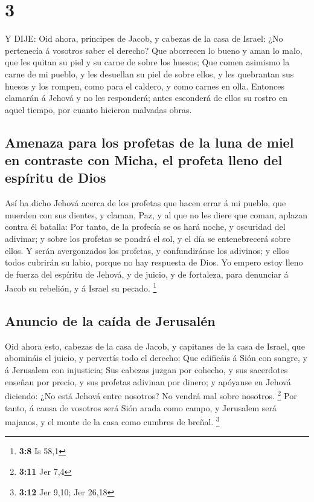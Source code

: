 \hypertarget{section-2}{%
\section{3}\label{section-2}}

 Y DIJE: Oid ahora, príncipes de Jacob, y cabezas de la casa
de Israel: ¿No pertenecía á vosotros saber el derecho?  Que
aborrecen lo bueno y aman lo malo, que les quitan su piel y su carne de
sobre los huesos;  Que comen asimismo la carne de mi pueblo,
y les desuellan su piel de sobre ellos, y les quebrantan sus huesos y
los rompen, como para el caldero, y como carnes en olla. 
Entonces clamarán á Jehová y no les responderá; antes esconderá de ellos
su rostro en aquel tiempo, por cuanto hicieron malvadas obras.

\hypertarget{amenaza-para-los-profetas-de-la-luna-de-miel-en-contraste-con-micha-el-profeta-lleno-del-espuxedritu-de-dios}{%
\subsection{Amenaza para los profetas de la luna de miel en contraste
con Micha, el profeta lleno del espíritu de
Dios}\label{amenaza-para-los-profetas-de-la-luna-de-miel-en-contraste-con-micha-el-profeta-lleno-del-espuxedritu-de-dios}}

 Así ha dicho Jehová acerca de los profetas que hacen errar
á mi pueblo, que muerden con sus dientes, y claman, Paz, y al que no les
diere que coman, aplazan contra él batalla:  Por tanto, de
la profecía se os hará noche, y oscuridad del adivinar; y sobre los
profetas se pondrá el sol, y el día se entenebrecerá sobre ellos.
 Y serán avergonzados los profetas, y confundiránse los
adivinos; y ellos todos cubrirán su labio, porque no hay respuesta de
Dios.  Yo empero estoy lleno de fuerza del espíritu de
Jehová, y de juicio, y de fortaleza, para denunciar á Jacob su rebelión,
y á Israel su pecado. \footnote{\textbf{3:8} Is 58,1}

\hypertarget{anuncio-de-la-cauxedda-de-jerusaluxe9n}{%
\subsection{Anuncio de la caída de
Jerusalén}\label{anuncio-de-la-cauxedda-de-jerusaluxe9n}}

 Oid ahora esto, cabezas de la casa de Jacob, y capitanes de
la casa de Israel, que abomináis el juicio, y pervertís todo el derecho;
 Que edificáis á Sión con sangre, y á Jerusalem con
injusticia;  Sus cabezas juzgan por cohecho, y sus
sacerdotes enseñan por precio, y sus profetas adivinan por dinero; y
apóyanse en Jehová diciendo: ¿No está Jehová entre nosotros? No vendrá
mal sobre nosotros. \footnote{\textbf{3:11} Jer 7,4}  Por
tanto, á causa de vosotros será Sión arada como campo, y Jerusalem será
majanos, y el monte de la casa como cumbres de breñal. \footnote{\textbf{3:12}
  Jer 9,10; Jer 26,18}

